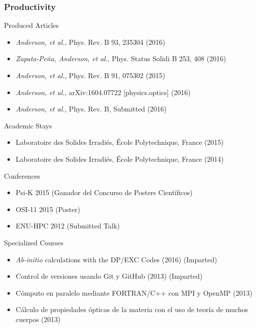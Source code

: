 \documentclass{beamer}
\begin{document}
\begin{frame}
\frametitle{Productivity}
\begin{block}{Produced Articles}
\begin{itemize}
\small
\item \emph{Anderson, et al.}, Phys. Rev. B 93, 235304 (2016)
\item \emph{Zapata-Pe\~na, Anderson, et al.}, Phys. Status Solidi B 253, 408 (2016) %
\item \emph{Anderson, et al.}, Phys. Rev. B 91, 075302 (2015)
\item \emph{Anderson, et al.}, arXiv:1604.07722 [physics.optics] (2016)
\item \emph{Anderson, et al.}, Phys. Rev. B, Submitted (2016)
\end{itemize}
\end{block}
\begin{block}{Academic Stays}
\begin{itemize}
\small
\item Laboratoire des Solides Irradi\'es, \'Ecole Polytechnique, France (2015)
\item Laboratoire des Solides Irradi\'es, \'Ecole Polytechnique, France (2014)
\end{itemize}
\end{block}
\end{frame}

\begin{frame}
\begin{block}{Conferences}
\begin{itemize}
\item Psi-K 2015 (Ganador del Concurso de Posters Cient\'ificos)
\item OSI-11 2015 (Poster)
\item ENU-HPC 2012 (Submitted Talk)
\end{itemize}
\end{block}
\begin{block}{Specialized Courses}
\begin{itemize}
\item \emph{Ab-initio} calculations with the DP/EXC Codes (2016) (Imparted)
\item Control de versiones usando Git y GitHub (2013) (Imparted)
\item C\'omputo en paralelo mediante FORTRAN/C++ con MPI y OpenMP (2013)
\item C\'alculo de propiedades \'opticas de la materia con el uso de teor\'ia 
      de muchos cuerpos (2013)
\end{itemize}
\end{block}
\end{frame}
\end{document}

